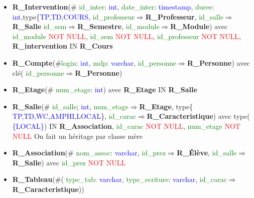 \documentclass{article}
\begin{document}
\begin{itemize}
\item \textbf{R\_Intervention}(\#\textcolor{green}{ id\_inter}: \textcolor{blue}{ int},\textcolor{green}{ date\_inter}: \textcolor{blue}{ timestamp},\textcolor{green}{ duree}: \textcolor{blue}{ int},type\{\textcolor{blue}{TP,TD,COURS},
 \textcolor{green}{ id\_professeur}$\Rightarrow$\textbf{R\_Professeur},\textcolor{green}{ id\_salle}$\Rightarrow$\textbf{R\_Salle} \textcolor{green}{ id\_sem}$\Rightarrow$\textbf{R\_Semestre},\textcolor{green}{ id\_module}$\Rightarrow$\textbf{R\_Module}) avec \textcolor{green}{ id\_module} \textcolor{red}{NOT NULL}, \textcolor{green}{ id\_sem} \textcolor{red}{NOT NULL}, \textcolor{green}{ id\_professeur} \textcolor{red}{NOT NULL},\textbf{ R\_intervention} IN \textbf{R\_Cours}\\

\item \textbf{R\_Compte}(\#\textcolor{green}{login}: \textcolor{blue}{ int}, \textcolor{green}{ mdp}: \textcolor{blue}{ varchar}, \textcolor{green}{ id\_personne}$\Rightarrow$\textbf{R\_Personne}) avec clé(\textcolor{green}{ id\_personne}$\Rightarrow$\textbf{R\_Personne})\\

\item \textbf{R\_Etage}(\#\textcolor{green}{ num\_etage}: \textcolor{blue}{ int}) avec \textbf{R\_Etage} IN \textbf{R\_Salle}  \\

\item \textbf{R\_Salle}(\#\textcolor{green}{ id\_salle}; \textcolor{blue}{ int},\textcolor{green}{ num\_etage}$\Rightarrow$\textbf{R\_Etage}, type\{\textcolor{blue}{ TP,TD,WC,AMPHI,LOCAL}\},\textcolor{green}{ id\_carac}$\Rightarrow$\textbf{R\_Caracteristique}) avec type(\textcolor{blue}{ \{LOCAL\}}) IN \textbf{R\_Association}, \textcolor{green}{ id\_carac} \textcolor{red}{NOT NULL}, \textcolor{green}{ num\_etage} \textcolor{red}{NOT NULL}        On fait un héritage par classe mère\\

\item \textbf{R\_Association}(\#\textcolor{green}{ nom\_assoc}: \textcolor{blue}{ varchar},\textcolor{green}{  id\_prez}$\Rightarrow$\textbf{R\_Élève},\textcolor{green}{  id\_salle}$\Rightarrow$\textbf{R\_Salle}) avec \textcolor{green}{ id\_prez} \textcolor{red}{NOT NULL}\\


\item \textbf{R\_Tableau}(\#(\textcolor{green}{ type\_tab}: \textcolor{blue}{ varchar}, \textcolor{green}{ type\_ecriture}: \textcolor{blue}{ varchar}, \textcolor{green}{ id\_carac}$\Rightarrow$\textbf{R\_Caracteristique}))\\


\end{itemize}
\end{document}
